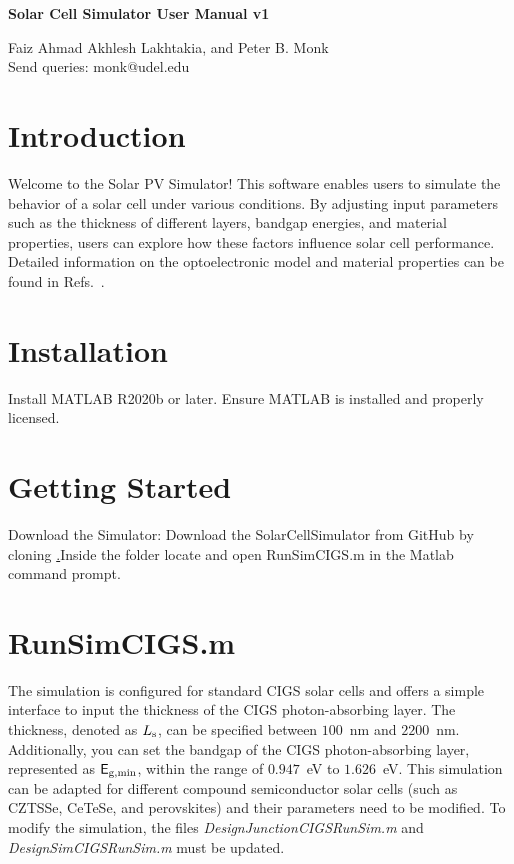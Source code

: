 \documentclass[10pt]{article}
\def\Ls{L_{\rm s}}
\def\sfE{{\sf E}}
\def\ego{\sfE_{\rm g,min}}
\def\Ls{L_{\rm s}}
\def\sfE{{\sf E}}
\def\ego{\sfE_{\rm g,min}}
\begin{document}
\begin{center}

\LARGE{ {\bf Solar Cell Simulator User Manual v1
}}
\end{center}
\begin{center}
\vspace{10mm} %

Faiz Ahmad
Akhlesh  Lakhtakia, and Peter B. Monk\\
{Send queries: monk@udel.edu}\\
\normalsize

 
\end{center}
\section{Introduction}
Welcome to the Solar PV Simulator! This software enables users to simulate the behavior of a solar cell under various conditions. By adjusting input parameters such as the thickness of different layers, bandgap energies, and material properties, users can explore how these factors influence solar cell performance. Detailed information on the optoelectronic model and material properties can be found in Refs.~\cite{Anderson2020, SolCellBook, Ahmad2022-2}.

\section{Installation}
Install MATLAB R2020b or later. Ensure MATLAB is installed and properly licensed.

\section{Getting Started}
Download the Simulator: Download the SolarCellSimulator
from GitHub by cloning \href{https://github.com/nibj/SolarCellSimulator.git} .Inside the folder locate and
open RunSimCIGS.m in the Matlab command prompt.


\section{RunSimCIGS.m}
The simulation is configured for standard CIGS solar cells and offers a simple interface to input the thickness of the CIGS photon-absorbing layer. The thickness, denoted as $\Ls$, can be specified between $100$~nm and $2200$~nm. Additionally, you can set the bandgap of the CIGS photon-absorbing layer, represented as $\ego$, within the range of $0.947$~eV to $1.626$~eV. This simulation can be adapted for different compound semiconductor solar cells (such as CZTSSe, CeTeSe, and perovskites) and their parameters need to be modified. To modify the simulation, the files \emph{DesignJunctionCIGSRunSim.m} and \emph{DesignSimCIGSRunSim.m} must be updated.
\end{document}
